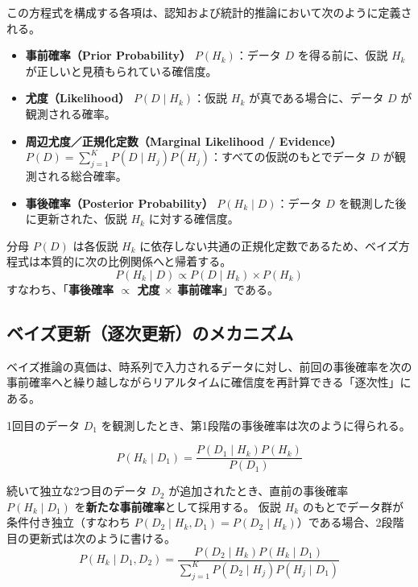 この方程式を構成する各項は、認知および統計的推論において次のように定義される。
\begin{itemize}
  \item \textbf{事前確率（Prior Probability）} $P(H_k)$：データ $D$ を得る前に、仮説 $H_k$ が正しいと見積もられている確信度。
  \item \textbf{尤度（Likelihood）} $P(D \mid H_k)$：仮説 $H_k$ が真である場合に、データ $D$ が観測される確率。
  \item \textbf{周辺尤度／正規化定数（Marginal Likelihood / Evidence）} $P(D) = \sum_{j=1}^K P(D \mid H_j) P(H_j)$：すべての仮説のもとでデータ $D$ が観測される総合確率。
  \item \textbf{事後確率（Posterior Probability）} $P(H_k \mid D)$：データ $D$ を観測した後に更新された、仮説 $H_k$ に対する確信度。
\end{itemize}

分母 $P(D)$ は各仮説 $H_k$ に依存しない共通の正規化定数であるため、ベイズ方程式は本質的に次の比例関係へと帰着する。
\begin{equation}
P(H_k \mid D) \propto P(D \mid H_k) \times P(H_k)
\label{eq:proportional}
\end{equation}
すなわち、「\textbf{事後確率 $\propto$ 尤度 $\times$ 事前確率}」である。

\subsection{ベイズ更新（逐次更新）のメカニズム}
ベイズ推論の真価は、時系列で入力されるデータに対し、前回の事後確率を次の事前確率へと繰り越しながらリアルタイムに確信度を再計算できる「逐次性」にある。

1回目のデータ $D_1$ を観測したとき、第1段階の事後確率は次のように得られる。

\begin{equation}
P(H_k \mid D_1) = \frac{P(D_1 \mid H_k) P(H_k)}{P(D_1)}
\label{eq:step1}
\end{equation}

続いて独立な2つ目のデータ $D_2$ が追加されたとき、直前の事後確率 $P(H_k \mid D_1)$ を\textbf{新たな事前確率}として採用する。
仮説 $H_k$ のもとでデータ群が条件付き独立（すなわち $P(D_2 \mid H_k, D_1) = P(D_2 \mid H_k)$）である場合、2段階目の更新式は次のように書ける。
\begin{equation}
P(H_k \mid D_1, D_2) = \frac{P(D_2 \mid H_k) P(H_k \mid D_1)}{\displaystyle\sum_{j=1}^K P(D_2 \mid H_j) P(H_j \mid D_1)}
\label{eq:step2_final}
\end{equation}

